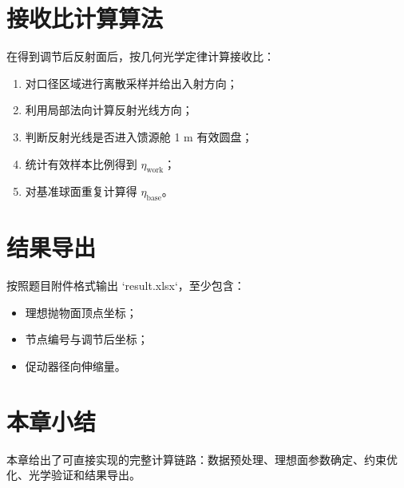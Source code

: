 \section{接收比计算算法}
在得到调节后反射面后，按几何光学定律计算接收比：
\begin{enumerate}
  \item 对口径区域进行离散采样并给出入射方向；
  \item 利用局部法向计算反射光线方向；
  \item 判断反射光线是否进入馈源舱 1 m 有效圆盘；
  \item 统计有效样本比例得到 $\eta_{\text{work}}$；
  \item 对基准球面重复计算得 $\eta_{\text{base}}$。
\end{enumerate}

\section{结果导出}
按照题目附件格式输出 `result.xlsx`，至少包含：
\begin{itemize}
  \item 理想抛物面顶点坐标；
  \item 节点编号与调节后坐标；
  \item 促动器径向伸缩量。
\end{itemize}

\section{本章小结}
本章给出了可直接实现的完整计算链路：数据预处理、理想面参数确定、约束优化、光学验证和结果导出。
